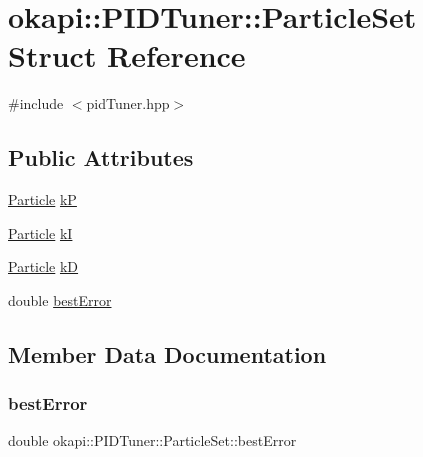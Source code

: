 \hypertarget{structokapi_1_1PIDTuner_1_1ParticleSet}{}\section{okapi\+::P\+I\+D\+Tuner\+::Particle\+Set Struct Reference}
\label{structokapi_1_1PIDTuner_1_1ParticleSet}


{\ttfamily \#include $<$pid\+Tuner.\+hpp$>$}

\subsection*{Public Attributes}
\begin{DoxyCompactItemize}
\item 
\mbox{\hyperlink{structokapi_1_1PIDTuner_1_1Particle}{Particle}} \mbox{\hyperlink{structokapi_1_1PIDTuner_1_1ParticleSet_ab03d8e49c5aab69a7155485a6b59c60c}{kP}}
\item 
\mbox{\hyperlink{structokapi_1_1PIDTuner_1_1Particle}{Particle}} \mbox{\hyperlink{structokapi_1_1PIDTuner_1_1ParticleSet_a94c29f71c13dd7f9e32fb8f7034f0ebc}{kI}}
\item 
\mbox{\hyperlink{structokapi_1_1PIDTuner_1_1Particle}{Particle}} \mbox{\hyperlink{structokapi_1_1PIDTuner_1_1ParticleSet_abb80aa753ff9af41d5ac159bb723f05d}{kD}}
\item 
double \mbox{\hyperlink{structokapi_1_1PIDTuner_1_1ParticleSet_aa81c4efddb45291d23eb13593bee6d25}{best\+Error}}
\end{DoxyCompactItemize}


\subsection{Member Data Documentation}
\mbox{\label{structokapi_1_1PIDTuner_1_1ParticleSet_aa81c4efddb45291d23eb13593bee6d25}} 
\subsubsection{\texorpdfstring{bestError}{bestError}}
{\footnotesize\ttfamily double okapi\+::\+P\+I\+D\+Tuner\+::\+Particle\+Set\+::best\+Error}

\mbox{\label{structokapi_1_1PIDTuner_1_1ParticleSet_abb80aa753ff9af41d5ac159bb723f05d}} 
